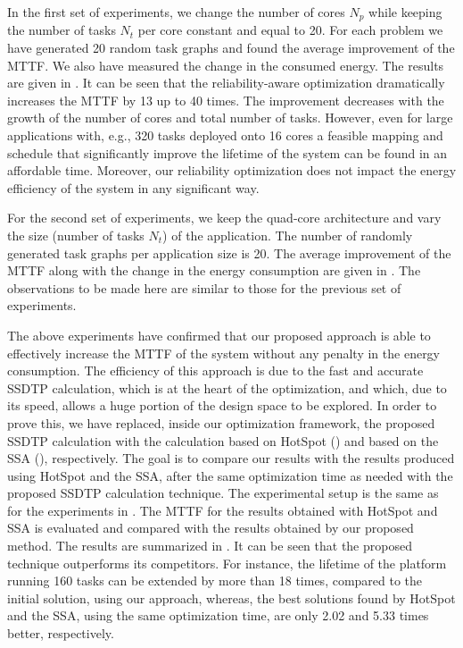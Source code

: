 In the first set of experiments, we change the number of cores $N_p$ while keeping the number of tasks $N_t$ per core constant and equal to 20. For each problem we have generated 20 random task graphs and found the average improvement of the MTTF. We also have measured the change in the consumed energy. The results are given in . It can be seen that the reliability-aware optimization dramatically increases the MTTF by 13 up to 40 times. The improvement decreases with the growth of the number of cores and total number of tasks. However, even for large applications with, e.g., 320 tasks deployed onto 16 cores a feasible mapping and schedule that significantly improve the lifetime of the system can be found in an affordable time. Moreover, our reliability optimization does not impact the energy efficiency of the system in any significant way.

For the second set of experiments, we keep the quad-core architecture and vary the size (number of tasks $N_t$) of the application. The number of randomly generated task graphs per application size is 20. The average improvement of the MTTF along with the change in the energy consumption are given in . The observations to be made here are similar to those for the previous set of experiments.

The above experiments have confirmed that our proposed approach is able to effectively increase the MTTF of the system without any penalty in the energy consumption. The efficiency of this approach is due to the fast and accurate SSDTP calculation, which is at the heart of the optimization, and which, due to its speed, allows a huge portion of the design space to be explored. In order to prove this, we have replaced, inside our optimization framework, the proposed SSDTP calculation with the calculation based on HotSpot () and based on the SSA (), respectively. The goal is to compare our results with the results produced using HotSpot and the SSA, after the same optimization time as needed with the proposed SSDTP calculation technique. The experimental setup is the same as for the experiments in . The MTTF for the results obtained with HotSpot and SSA is evaluated and compared with the results obtained by our proposed method. The results are summarized in . It can be seen that the proposed technique outperforms its competitors. For instance, the lifetime of the platform running 160 tasks can be extended by more than 18 times, compared to the initial solution, using our approach, whereas, the best solutions found by HotSpot and the SSA, using the same optimization time, are only 2.02 and 5.33 times better, respectively.

